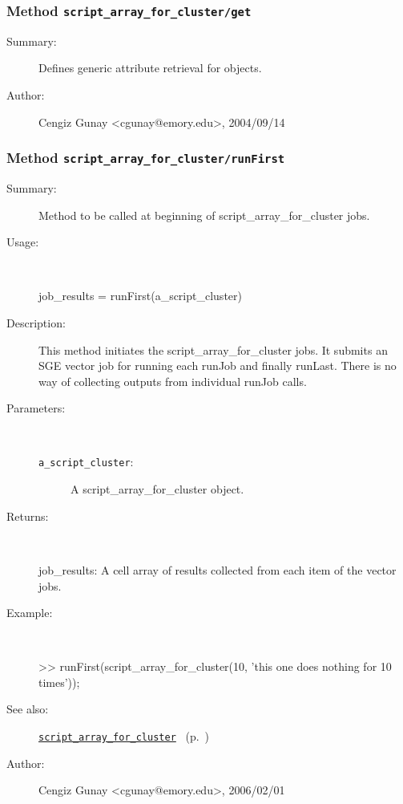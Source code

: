 \subsubsection[Method \texttt{get}]{Method \texttt{script\_array\_for\_cluster/get}}%
%
\label{ref_script_array_for_cluster__get}%
\hypertarget{ref_script_array_for_cluster__get}{}%
\begin{description}
\item[Summary:]Defines generic attribute retrieval for objects.
%
%
%
%
%
%
%
\item[Author:]%
Cengiz Gunay <cgunay@emory.edu>, 2004/09/14
%
\end{description}
\methodline%
\subsubsection[Method \texttt{runFirst}]{Method \texttt{script\_array\_for\_cluster/runFirst}}%
%
\label{ref_script_array_for_cluster__runFirst}%
\hypertarget{ref_script_array_for_cluster__runFirst}{}%
\begin{description}
\item[Summary:]Method to be called at beginning of script\_array\_for\_cluster jobs.
%
\item[Usage:]~%
\begin{lyxcode}%
job\_results = runFirst(a\_script\_cluster)
%
\end{lyxcode}%
%
\item[Description:]%
This method initiates the script\_array\_for\_cluster jobs. It submits an SGE
 vector job for running each runJob and finally runLast. There is no way of
 collecting outputs from individual runJob calls.
\item[Parameters:]~
\begin{description}%
\item[\texttt{a\_script\_cluster}:]
 A script\_array\_for\_cluster object.
\end{description}%
%
\item[Returns:
]~

	job\_results: A cell array of results collected from each item of the vector jobs.
%
\item[Example:]~
\begin{lyxcode} >> runFirst(script\_array\_for\_cluster(10, 'this one does nothing for 10 times'));
\\%
\end{lyxcode}
%
\item[See also:]%
\hyperlink{ref_script_array_for_cluster}{\texttt{script\_array\_for\_cluster}}%
\ (p.~\pageref{ref_script_array_for_cluster})%
%
%
\item[Author:]%
Cengiz Gunay <cgunay@emory.edu>, 2006/02/01
%
\end{description}
\methodline%
